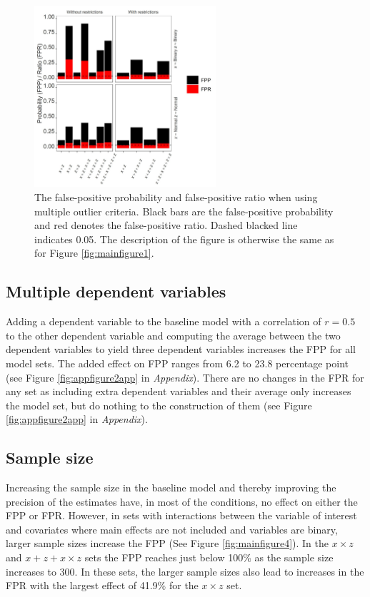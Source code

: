 \begin{figure}[hbt!]
\includegraphics[width=0.6\textwidth]{R/Analysis/Result/Figures/Figure1B.jpeg}
\centering
\caption{The false-positive probability and false-positive ratio when using multiple outlier criteria. Black bars are the false-positive probability and red denotes the false-positive ratio. Dashed blacked line indicates 0.05. The description of the figure is otherwise the same as for Figure \ref{fig:mainfigure1}.}
\label{fig:mainfigure3}
\end{figure}

\subsection{Multiple dependent variables}
Adding a dependent variable to the baseline model with a correlation of $r=0.5$ to the other dependent variable and computing the average between the two dependent variables to yield three dependent variables increases the FPP for all model sets. The added effect on FPP ranges from 6.2 to 23.8 percentage point (see Figure \ref{fig:appfigure2app} in \textit{Appendix}). There are no changes in the FPR for any set as including extra dependent variables and their average only increases the model set, but do nothing to the construction of them (see Figure \ref{fig:appfigure2app} in \textit{Appendix}).   

\subsection{Sample size}
Increasing the sample size in the baseline model and thereby improving the precision of the estimates have, in most of the conditions, no effect on either the FPP or FPR. However, in sets with interactions between the variable of interest and covariates where main effects are not included and variables are binary, larger sample sizes increase the FPP (See Figure \ref{fig:mainfigure4}). In the $x \times z$ and $x + z+ x \times z$ sets the FPP reaches just below 100\% as the sample size increases to 300. In these sets, the larger sample sizes also lead to increases in the FPR with the largest effect of 41.9\% for the $x \times z$ set.  


